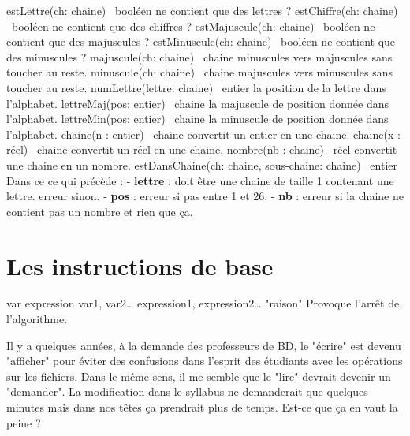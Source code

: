 	\begin{Pseudocode}
		\Stmt estLettre(ch: chaine) \Gives~booléen		\RComment ne contient que des lettres ?
		\Stmt estChiffre(ch: chaine) \Gives~booléen		\RComment ne contient que des chiffres ?
		\Stmt estMajuscule(ch: chaine) \Gives~booléen	\RComment ne contient que des majuscules ?
		\Stmt estMinuscule(ch: chaine) \Gives~booléen	\RComment ne contient que des minuscules ? 
		\Empty
		\Stmt majuscule(ch: chaine) \Gives~chaine		\RComment minuscules vers majuscules sans toucher au reste.
		\Stmt minuscule(ch: chaine) \Gives~chaine		\RComment majuscules vers minuscules sans toucher au reste.
		\Stmt numLettre(lettre: chaine) \Gives~entier	\RComment la position de la lettre dans l'alphabet.
		\Stmt lettreMaj(pos: entier) \Gives~chaine		\RComment la majuscule de position donnée dans l'alphabet.
		\Stmt lettreMin(pos: entier) \Gives~chaine		\RComment la minuscule de position donnée dans l'alphabet.
		\Stmt chaine(n : entier) \Gives~chaine			\RComment convertit un entier en une chaine.
		\Stmt chaine(x : réel) \Gives~chaine			\RComment convertit un réel en une chaine.
		\Stmt nombre(nb : chaine) \Gives~réel			\RComment convertit une chaine en un nombre.
		\Empty
		\Stmt estDansChaine(ch: chaine, sous-chaine: chaine) \Gives~entier 
		\Stmt 											{}
		\Empty
		\LComment Dans ce ce qui précède :
		\LComment - \textbf{lettre} : doit être une chaine de taille 1 contenant une lettre. erreur sinon.
		\LComment - \textbf{pos} : erreur si pas entre 1 et 26.
		\LComment - \textbf{nb} : erreur si la chaine ne contient pas un nombre et rien que ça.
	\end{Pseudocode}

\section{Les instructions de base}

	\begin{Pseudocode}
	\Let var \Gets expression
	\Read var1, var2\dots
	\Write expression1, expression2\dots
	\Error "raison" \Comment Provoque l'arrêt de l'algorithme.
	\end{Pseudocode}

	\begin{Note}
	Il y a quelques années, à la demande des professeurs de BD,
	le "écrire" est devenu "afficher" pour éviter des confusions
	dans l'esprit des étudiants avec les opérations sur les fichiers. 
	Dans le même sens, il me semble que le "lire" devrait
	devenir un "demander". 
	La modification dans le syllabus ne demanderait que quelques
	minutes mais dans nos têtes ça prendrait plus de temps.
	Est-ce que ça en vaut la peine ?
	\end{Note}


